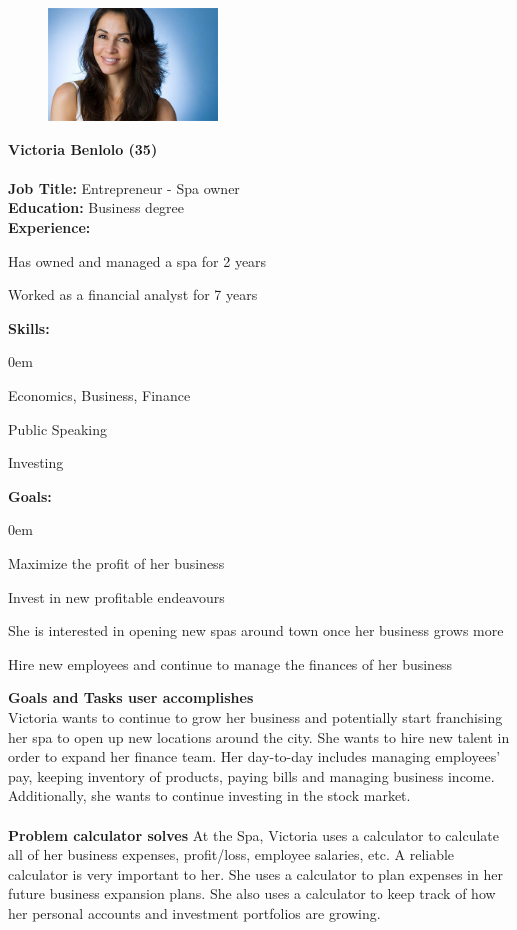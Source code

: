 \documentclass{article}
\begin{document}
\begin{figure}
\includegraphics[width=0.40\textwidth]{victoria.jpg}
\end{figure}
\textbf{\Large Victoria Benlolo (35)} \\ \\
\textbf{Job Title: }Entrepreneur - Spa owner \\
\textbf{Education:} Business degree \\
\textbf{Experience:}
\begin{compactitem}
\item Has owned and managed a spa for 2 years
\item Worked as a financial analyst for 7 years
\end{compactitem}
\textbf{Skills:}
\begin{compactitem}
\itemsep0em 
\item Economics, Business, Finance
\item Public Speaking
\item Investing
\end{compactitem}
\textbf{Goals:}
\begin{compactitem}
\itemsep0em 
\item Maximize the profit of her business
\item Invest in new profitable endeavours 
\item She is interested in opening new spas around town once her business grows more
\item Hire new employees and continue to manage the finances of her business
\end{compactitem}
\bigskip 
\textbf{Goals and Tasks user accomplishes}\\
Victoria wants to continue to grow her business and potentially start franchising her spa to open up new locations around the city. She wants to hire new talent in order to expand her finance team. Her day-to-day includes managing employees' pay, keeping inventory of products, paying bills and managing business income. Additionally, she wants to continue investing in the stock market. \\ \\
\textbf{Problem calculator solves}
At the Spa, Victoria uses a calculator to calculate all of her business expenses, profit/loss, employee salaries, etc. A reliable calculator is very important to her. She uses a calculator to plan expenses in her future business expansion plans.  She also uses a calculator to keep track of how her personal accounts and investment portfolios are growing. 
\pagebreak
\end{document}
